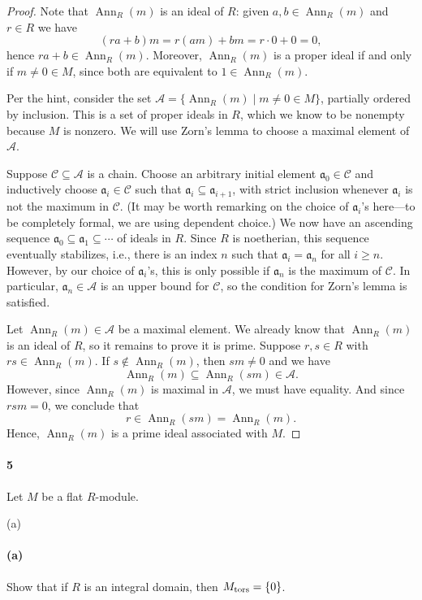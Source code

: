 \documentclass[12pt]{article}
\newlength{\myparskip}
\newenvironment{fullbox}{\begin{lrbox}{\savefullbox}\begin{minipage}{\dimexpr\textwidth-2\fboxsep\relax}\setlength{\parskip}{\myparskip}}{\end{minipage}\end{lrbox}\framebox[\textwidth]{\usebox{\savefullbox}}}
\newenvironment{pbox}[1][]{\begin{fullbox}\ifx#1\empty\else\paragraph{#1}\phantom{}\fi}{\end{fullbox}}
\theoremstyle{definition}
\newcommand{\<}{\langle}
\renewcommand{\>}{\rangle}
\newcommand{\seq}{\subseteq}
\renewcommand{\aa}{\mathfrak{a}}
\renewcommand{\AA}{\mathcal{A}}
\newcommand{\CC}{\mathcal{C}}
\DeclareMathOperator{\Ann}{Ann}
\begin{document}
\begin{proof}
    Note that $\Ann_R(m)$ is an ideal of $R$: given $a, b \in \Ann_R(m)$ and $r \in R$ we have
    \[
        (ra + b)m = r(am) + bm = r \cdot 0 + 0 = 0,
    \]
    hence $ra + b \in \Ann_R(m)$.
    Moreover, $\Ann_R(m)$ is a proper ideal if and only if $m \ne 0 \in M$, since both are equivalent to $1 \in \Ann_R(m)$.

    Per the hint, consider the set $\AA = \{\Ann_R(m) \mid m \ne 0 \in M\}$, partially ordered by inclusion.
    This is a set of proper ideals in $R$, which we know to be nonempty because $M$ is nonzero.
    We will use Zorn's lemma to choose a maximal element of $\AA$.

    Suppose $\CC \seq \AA$ is a chain.
    Choose an arbitrary initial element $\aa_0 \in \CC$ and inductively choose $\aa_i \in \CC$ such that $\aa_i \seq \aa_{i+1}$, with strict inclusion whenever $\aa_i$ is not the maximum in $\CC$.
    (It may be worth remarking on the choice of $\aa_i$'s here---to be completely formal, we are using dependent choice.)
    We now have an ascending sequence $\aa_0 \seq \aa_1 \seq \cdots$ of ideals in $R$.
    Since $R$ is noetherian, this sequence eventually stabilizes, i.e., there is an index $n$ such that $\aa_i = \aa_n$ for all $i \geq n$.
    However, by our choice of $\aa_i$'s, this is only possible if $\aa_n$ is the maximum of $\CC$.
    In particular, $\aa_n \in \AA$ is an upper bound for $\CC$, so the condition for Zorn's lemma is satisfied.

    Let $\Ann_R(m) \in \AA$ be a maximal element.
    We already know that $\Ann_R(m)$ is an ideal of $R$, so it remains to prove it is prime.
    Suppose $r, s \in R$ with $rs \in \Ann_R(m)$.
    If $s \notin \Ann_R(m)$, then $sm \ne 0$ and we have
    \[
        \Ann_R(m) \seq \Ann_R(sm) \in \AA.
    \]
    However, since $\Ann_R(m)$ is maximal in $\AA$, we must have equality.
    And since $rsm = 0$, we conclude that
    \[
        r \in \Ann_R(sm) = \Ann_R(m).
    \]
    Hence, $\Ann_R(m)$ is a prime ideal associated with $M$.
\end{proof}

\newpage
\begin{pbox}[5]
    Let $M$ be a flat $R$-module. 
\end{pbox}

\begin{pbox}[(a)]
    Show that if $R$ is an integral domain, then $M_{\rm tors}=\{0\}$.
\end{pbox}
\end{document}
